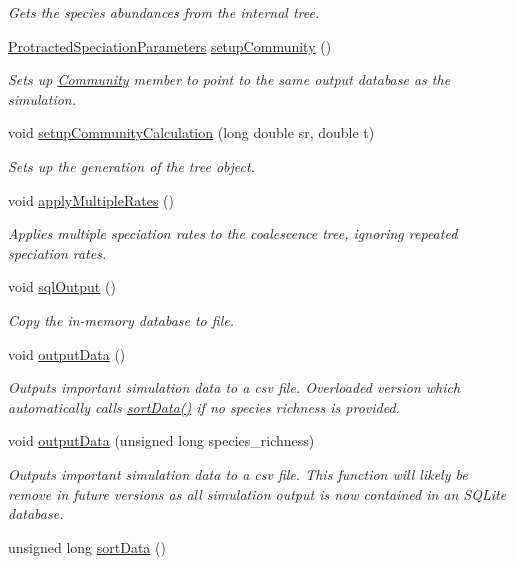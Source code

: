 \begin{DoxyCompactItemize}
\begin{DoxyCompactList}\small\item\em Gets the species abundances from the internal tree. \end{DoxyCompactList}\item 
\hyperlink{struct_protracted_speciation_parameters}{Protracted\+Speciation\+Parameters} \hyperlink{class_tree_ae39208e0f31a0170414a80e2b2d4e400}{setup\+Community} ()
\begin{DoxyCompactList}\small\item\em Sets up \hyperlink{class_community}{Community} member to point to the same output database as the simulation. \end{DoxyCompactList}\item 
void \hyperlink{class_tree_aaa85f6886029ee48472241cab746ded1}{setup\+Community\+Calculation} (long double sr, double t)
\begin{DoxyCompactList}\small\item\em Sets up the generation of the tree object. \end{DoxyCompactList}\item 
void \hyperlink{class_tree_acfc7efdec999f6dbf2ac089514d22091}{apply\+Multiple\+Rates} ()
\begin{DoxyCompactList}\small\item\em Applies multiple speciation rates to the coalescence tree, ignoring repeated speciation rates. \end{DoxyCompactList}\item 
void \hyperlink{class_tree_a8cd3db7add1884ea53b0d98002d39cd3}{sql\+Output} ()
\begin{DoxyCompactList}\small\item\em Copy the in-\/memory database to file. \end{DoxyCompactList}\item 
void \hyperlink{class_tree_afdf680e187c25ed39d1e66542ce44cc3}{output\+Data} ()\hypertarget{class_tree_afdf680e187c25ed39d1e66542ce44cc3}{}\label{class_tree_afdf680e187c25ed39d1e66542ce44cc3}

\begin{DoxyCompactList}\small\item\em Outputs important simulation data to a csv file. Overloaded version which automatically calls \hyperlink{class_tree_a2d2065bbebee8b55270d2691d40cd974}{sort\+Data()} if no species richness is provided. \end{DoxyCompactList}\item 
void \hyperlink{class_tree_a5acf7d0eea9ea2ef4928bb6691b87724}{output\+Data} (unsigned long species\+\_\+richness)
\begin{DoxyCompactList}\small\item\em Outputs important simulation data to a csv file. This function will likely be remove in future versions as all simulation output is now contained in an S\+Q\+Lite database. \end{DoxyCompactList}\item 
unsigned long \hyperlink{class_tree_a2d2065bbebee8b55270d2691d40cd974}{sort\+Data} ()\hypertarget{class_tree_a2d2065bbebee8b55270d2691d40cd974}{}\label{class_tree_a2d2065bbebee8b55270d2691d40cd974}


\end{DoxyCompactItemize}
